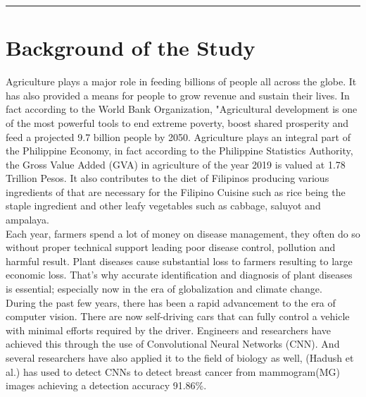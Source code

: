
\vspace{-1cm}\noindent\rule{\textwidth}{0.4pt}
\section{Background of the Study}

Agriculture plays a major role in feeding billions of people all
across the globe. It has also provided a means for people
to grow revenue and sustain their lives. In fact according to the 
World Bank Organization, "Agricultural development 
is one of the most powerful tools to end extreme poverty, 
boost shared prosperity and feed a projected 9.7 billion people by 2050.
Agriculture plays an integral 
part of the Philippine Economy, 
in fact according to the Philippine Statistics Authority, the Gross 
Value Added (GVA) in agriculture of the year 2019
is valued at 1.78 Trillion Pesos. 
It also contributes to the diet of Filipinos producing various 
ingredients of that are necessary for the Filipino Cuisine such as rice 
being the staple ingredient and other leafy vegetables such as cabbage,
saluyot and ampalaya. \\



Each year, farmers spend a lot of money on disease management, they 
often do so without proper technical support leading poor disease 
control, pollution and harmful result. Plant diseases cause 
substantial loss to farmers resulting to large economic loss.
That's why accurate identification and diagnosis of plant diseases is 
essential; especially now in the era of globalization and climate 
change. \\

During the past few years, there has been a rapid advancement to the
era of computer vision. There are now self-driving cars that can fully
control a vehicle with minimal efforts required by the driver. Engineers 
and researchers have achieved this through the use of Convolutional 
Neural Networks (CNN). And several researchers have also applied it to the field
of biology as well, (Hadush et al.) has used to detect CNNs to detect breast 
cancer from mammogram(MG) images achieving a detection accuracy 91.86\%. \\


